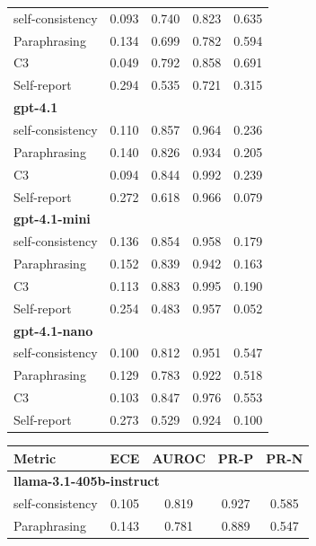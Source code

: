 \documentclass[11pt]{article}
\theoremstyle{plain}
\theoremstyle{definition}
\theoremstyle{remark}
\begin{document}
\begin{table}[p]
\begin{minipage}[t]{0.48\textwidth}
\begin{tabular}{lcccc}
        self-consistency & 0.093 & 0.740 & 0.823 & 0.635 \\
        Paraphrasing     & 0.134 & 0.699 & 0.782 & 0.594 \\
       C3             & 0.049 & 0.792 & 0.858 & 0.691 \\
        Self-report      & 0.294 & 0.535 & 0.721 & 0.315 \\
        \midrule
        \multicolumn{5}{l}{\textbf{gpt-4.1}} \\
        self-consistency & 0.110 & 0.857 & 0.964 & 0.236 \\
        Paraphrasing     & 0.140 & 0.826 & 0.934 & 0.205 \\
       C3             & 0.094 & 0.844 & 0.992 & 0.239 \\
        Self-report      & 0.272 & 0.618 & 0.966 & 0.079 \\
        \midrule
        \multicolumn{5}{l}{\textbf{gpt-4.1-mini}} \\
        self-consistency & 0.136 & 0.854 & 0.958 & 0.179 \\
        Paraphrasing     & 0.152 & 0.839 & 0.942 & 0.163 \\
       C3             & 0.113 & 0.883 & 0.995 & 0.190 \\
        Self-report      & 0.254 & 0.483 & 0.957 & 0.052 \\
        \midrule
        \multicolumn{5}{l}{\textbf{gpt-4.1-nano}} \\
        self-consistency & 0.100 & 0.812 & 0.951 & 0.547 \\
        Paraphrasing     & 0.129 & 0.783 & 0.922 & 0.518 \\
       C3             & 0.103 & 0.847 & 0.976 & 0.553 \\
        Self-report      & 0.273 & 0.529 & 0.924 & 0.100 \\
        \bottomrule
    \end{tabular}
\end{minipage}
\hfill
\begin{minipage}[t]{0.48\textwidth}
    \centering
    \begin{tabular}{lcccc}
        \toprule
        \textbf{Metric} & \textbf{ECE} & \textbf{AUROC} & \textbf{PR-P} & \textbf{PR-N} \\
        \midrule
        \multicolumn{5}{l}{\textbf{llama-3.1-405b-instruct}} \\
        self-consistency & 0.105 & 0.819 & 0.927 & 0.585 \\
        Paraphrasing     & 0.143 & 0.781 & 0.889 & 0.547 \\

\end{tabular}
\end{minipage}
\end{table}
\end{document}
